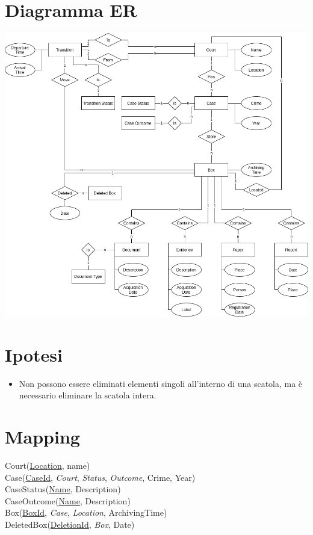 \documentclass{article}
\begin{document}
\section{Diagramma ER}

\begin{adjustwidth}{-50cm}{-50cm}
    \vspace{\fill}
    \begin{center}
        \includegraphics[scale=0.55]{../images/er.png}
    \end{center}
    \vspace{\fill}
\end{adjustwidth}

\section{Ipotesi}

\begin{itemize}
    \item Non possono essere eliminati elementi singoli all'interno di una scatola, ma è necessario eliminare la scatola intera.
\end{itemize}

\section{Mapping}

Court(\underline{Location}, name) \\
Case(\underline{CaseId}, \textit{Court}, \textit{Status}, \textit{Outcome}, Crime, Year) \\
CaseStatus(\underline{Name}, Description) \\
CaseOutcome(\underline{Name}, Description) \\
Box(\underline{BoxId}, \textit{Case}, \textit{Location}, ArchivingTime) \\
DeletedBox(\underline{DeletionId}, \textit{Box}, Date)
\end{document}
